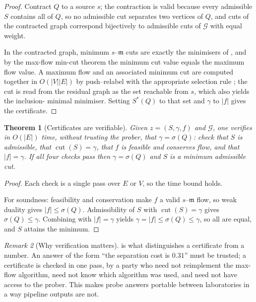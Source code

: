 \documentclass[11pt,a4paper]{article}
\newtheorem{theorem}{Theorem}[section]
\theoremstyle{definition}
\theoremstyle{remark}
\newtheorem{remark}[theorem]{Remark}
\newcommand{\Gph}{\mathcal{G}}
\newcommand{\med}{\mathfrak{m}}
\newcommand{\cut}{\operatorname{cut}}
\newcommand{\sep}{\sigma}
\begin{document}
\begin{proof}
Contract $Q$ to a source $s$; the contraction is valid because every
admissible $S$ contains all of $Q$, so no admissible cut separates two
vertices of $Q$, and cuts of the contracted graph correspond bijectively
to admissible cuts of $\Gph$ with equal weight.

In the contracted graph, minimum $s$--$\med$ cuts are exactly the
minimisers of , and by the max-flow min-cut theorem
\citep{fordfulkerson1956,menger1927} the minimum cut value equals the
maximum flow value. A maximum flow and an associated minimum cut are
computed together in $O(|V||E|)$ by push--relabel with the appropriate
selection rule \citep{goldberg1988new}; the cut is read from the residual
graph as the set reachable from $s$, which also yields the inclusion-
minimal minimiser. Setting $S^{\ast}(Q)$ to that set and $\gamma$ to
$|f|$ gives the certificate.
\end{proof}

\begin{theorem}[Certificates are verifiable]\label{thm:verify}
Given $z = (S,\gamma,f)$ and $\Gph$, one verifies in $O(|E|)$ time,
without trusting the prober, that $\gamma = \sep(Q)$: check that $S$ is
admissible, that $\cut(S) = \gamma$, that $f$ is feasible and conserves
flow, and that $|f| = \gamma$. If all four checks pass then
$\gamma = \sep(Q)$ and $S$ is a minimum admissible cut.
\end{theorem}

\begin{proof}
Each check is a single pass over $E$ or $V$, so the time bound holds.

For soundness: feasibility and conservation make $f$ a valid $s$--$\med$
flow, so weak duality gives $|f| \leq \sep(Q)$. Admissibility of $S$ with
$\cut(S) = \gamma$ gives $\sep(Q) \leq \gamma$. Combining with
$|f| = \gamma$ yields
$\gamma = |f| \leq \sep(Q) \leq \gamma$, so all are equal, and $S$
attains the minimum.
\end{proof}

\begin{remark}[Why verification matters]\label{rem:verify}
 is what distinguishes a certificate from a number. An
answer of the form ``the separation cost is $0.31$'' must be trusted; a
certificate is checked in one pass, by a party who need not reimplement
the max-flow algorithm, need not know which algorithm was used, and need
not have access to the prober. This makes probe answers portable between
laboratories in a way pipeline outputs are not.
\end{remark}
\end{document}

